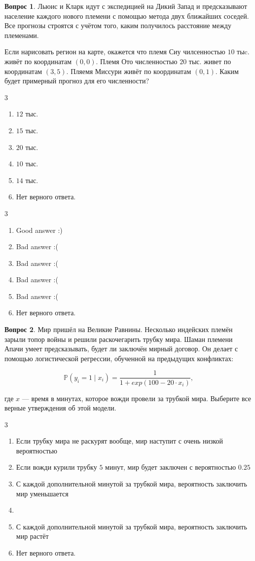 \documentclass[12pt]{article}
\newenvironment{answerlist}[1][3]{
\begin{multicols}{#1}

\begin{enumerate}[label=\fbox{\emph{\Alph*}},ref=\emph{\alph*}]
}
{
\item Нет верного ответа.
\end{enumerate}
\end{multicols}
}
\theoremstyle{definition}
\newtheorem{question}{Вопрос}
\begin{document}
\newpage 

\begin{question}
Льюис и Кларк идут с экспедицией на Дикий Запад и предсказывают население каждого нового племени с помощью метода двух ближайших соседей. Все прогнозы строятся с учётом того, каким получилось расстояние между племенами. 

Если нарисовать регион на карте, окажется что племя Сиу чилсенностью $10$ тыc. живёт по координатам $(0, 0)$. Племя Ото численностью $20$ тыс. живет по координатам $(3, 5)$.  Пляемя Миссури живёт по координатам  $(0, 1)$. Каким будет примерный прогноз для его численности?  

\begin{answerlist}
   \item $12$ тыс.
   \item $15$ тыс.
   \item $20$ тыс.
   \item $10$ тыс.
   \item $14$ тыс.
\end{answerlist}
\end{question}

\begin{solution}
\begin{answerlist}
  \item Good answer :)
  \item Bad answer :(
  \item Bad answer :(
  \item Bad answer :(
  \item Bad answer :(
\end{answerlist}
\end{solution}


\begin{question}
Мир пришёл на Великие Равнины. Несколько индейских племён зарыли топор войны и решили раскочегарить трубку мира. Шаман племени Апачи умеет предсказывать, будет ли заключён мирный договор. Он делает с помощью логистической регрессии, обученной на предыдущих конфликтах: 

\[ 
\mathbb{P}(y_i = 1 \mid x_i) =  \frac{1}{1 + exp(100 - 20 \cdot x_i)},
\]

где $x$ --- время в минутах, которое вожди провели за трубкой мира.  Выберите все верные утверждения об этой модели. 

\begin{answerlist}
   \item  Если трубку мира не раскурят вообще, мир наступит с очень низкой вероятностью
   \item  Если вожди курили трубку $5$ минут, мир будет заключен с вероятностью $0.25$
   \item  С каждой дополнительной минутой за трубкой мира, вероятность заключить мир уменьшается 
   \item  {}    \mbox{ }  
   \item  С каждой дополнительной минутой за трубкой мира, вероятность заключить мир растёт
\end{answerlist}
\end{question}
\end{document}
